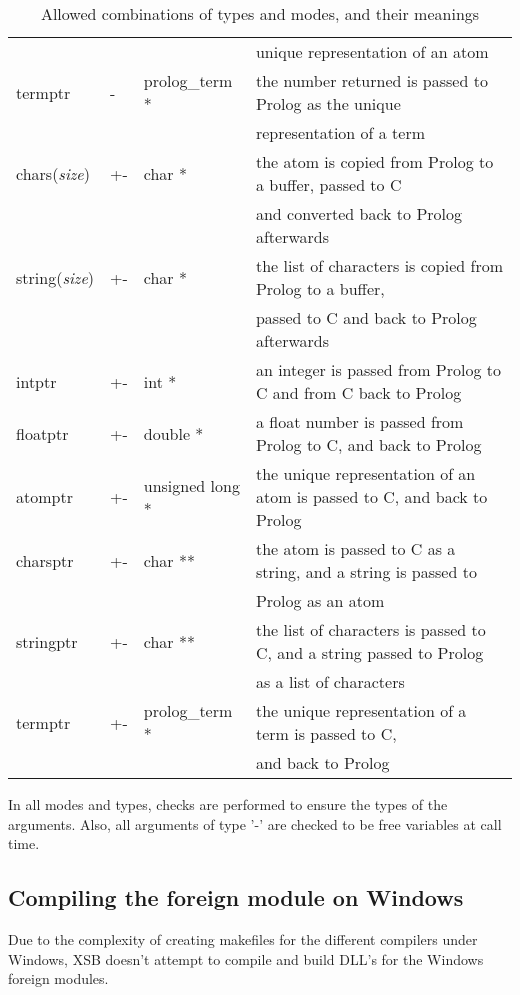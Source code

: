 \begin{table}
\begin{tabular}{||l|l|l|l||}
 & & & unique representation of an atom \\
termptr & - & prolog\_term * & the number returned is passed to Prolog
as the unique\\
 & & & representation of a term \\
\hline
chars(\emph{size}) & +- & char * & the atom is copied from Prolog to a
buffer, passed to C \\
 & & & and converted back to Prolog afterwards \\
string(\emph{size}) & +- & char * & the list of characters is copied
from Prolog to a buffer, \\
 & & & passed to C and back to Prolog afterwards \\
intptr & +- & int * & an integer is passed from Prolog to C and from C
back to Prolog \\
floatptr & +- & double * & a float number is passed from Prolog to C,
and back to Prolog \\
atomptr & +- & unsigned long * & the unique representation of an atom
is passed to C, and back to Prolog \\
charsptr & +- & char ** & the atom is passed to C as a string, and 
a string is passed to\\
 & & & Prolog as an atom \\
stringptr & +- & char ** & the list of characters is passed to C, and
a string passed to Prolog \\
 & & & as a list of characters \\
termptr & +- & prolog\_term * & the unique representation of a term is
passed to C, \\
 & & & and back to Prolog \\
\hline
\hline
\end{tabular}
\caption{Allowed combinations of types and modes, and their meanings}
\label{tbl-types-p}
\end{table}

In all modes and types, checks are performed to ensure the types of
the arguments. Also, all arguments of type '-' are checked to be free
variables at call time.

\subsection{Compiling the foreign module on Windows}

Due to the complexity of
creating makefiles for the different compilers under Windows,
XSB doesn't attempt to compile and build 
DLL's for the Windows foreign modules.

